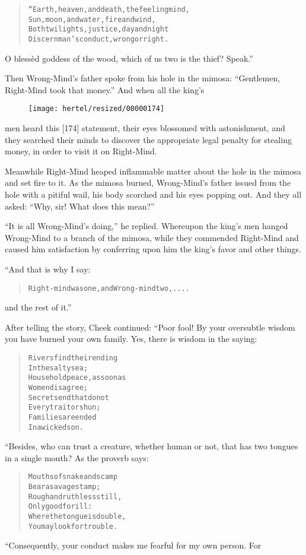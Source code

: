 \documentclass[article, twoside, 10pt]{memoir}
\renewenvironment{verbatim}{%
\begin{quote}%
\vskip -10pt%
\begin{alltt}\normalfont\small}{\end{alltt}%
\end{quote}%
\vskip -10pt
} %
\begin{document}
\begin{verbatim}
“Earth, heaven, and death, the feeling mind,
Sun, moon, and water, fire and wind,
Both twilights, justice, day and night
Discern man's conduct, wrong or right.
\end{verbatim}
O blessèd goddess of the wood, which of us two is the thief?
Speak.”

Then Wrong-Mind's father spoke from his hole in the mimosa:
``Gentlemen, Right-Mind took that money.'' And when all the king's
\begin{figure}[p]\texttt{[image: hertel/resized/00000174]}\end{figure}men heard this [174] statement, their eyes blossomed with
astonishment, and they searched their minds to discover the
appropriate legal penalty for stealing money, in order to visit it
on Right-Mind.

Meanwhile Right-Mind heaped inflammable matter about the hole in
the mimosa and set fire to it. As the mimosa burned, Wrong-Mind's
father issued from the hole with a pitiful wail, his body scorched
and his eyes popping out. And they all asked:
``Why, sir! What does this mean?''

``It is all Wrong-Mind's doing,'' he replied. Whereupon the king's
men hanged Wrong-Mind to a branch of the mimosa, while they
commended Right-Mind and caused him satisfaction by conferring upon
him the king's favor and other things.

“And that is why I say:

\begin{verbatim}
Right-mind was one, and Wrong-mind two, ....
\end{verbatim}
and the rest of it.”

After telling the story, Cheek continued: “Poor fool! By your
oversubtle wisdom you have burned your own family. Yes, there is
wisdom in the saying:

\begin{verbatim}
Rivers find their ending
    In the salty sea;
Household peace, as soon as
    Women disagree;
Secrets end that do not
    Every traitor shun;
Families are ended
    In a wicked son.
\end{verbatim}
“Besides, who can trust a creature, whether human or not, that has
two tongues in a single mouth? As the proverb says:

\begin{verbatim}
Mouths of snake and scamp
Bear a savage stamp;
Rough and ruthless still,
Only good for ill:
Where the tongue is double,
You may look for trouble.
\end{verbatim}
“Consequently, your conduct makes me fearful for my own person.
For
\end{document}

